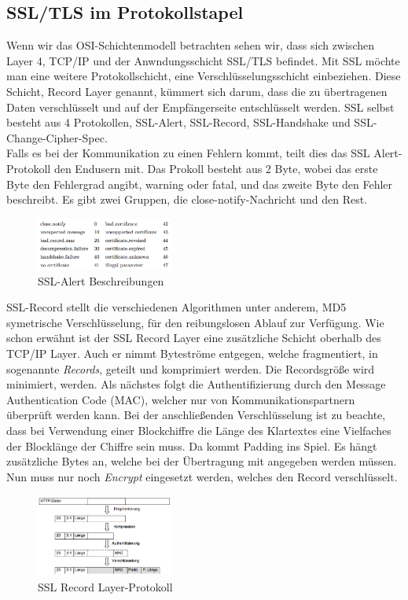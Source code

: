 \documentclass[11pt]{scrartcl}
\begin{document}
\subsection{SSL/TLS im Protokollstapel}
\label{sec:ssl-tls-protocolstack}
Wenn wir das OSI-Schichtenmodell betrachten sehen wir, dass sich zwischen Layer 4, TCP/IP und der Anwndungsschicht SSL/TLS befindet. Mit SSL möchte man eine weitere Protokollschicht, eine Verschlüsselungsschicht einbeziehen. Diese Schicht, Record Layer genannt, kümmert sich darum, dass die zu übertragenen Daten verschlüsselt und auf der Empfängerseite entschlüsselt werden. SSL selbst besteht aus 4 Protokollen, SSL-Alert, SSL-Record, SSL-Handshake und SSL-Change-Cipher-Spec.\\
Falls es bei der Kommunikation zu einen Fehlern kommt, teilt dies das SSL Alert-Protokoll den Endusern mit. Das Prokoll besteht aus 2 Byte, wobei das erste Byte den Fehlergrad angibt, warning oder fatal, und das zweite Byte den Fehler beschreibt. Es gibt zwei Gruppen, die close-notify-Nachricht und den Rest. \cite{1}\cite{6}
\begin{figure}[H]
\includegraphics[width=0.40\textwidth]{Bilder/TLS/SSL-Alert}
	\caption{SSL-Alert Beschreibungen \cite{1}}
	\label{fig12}
\end{figure}
\noindent
SSL-Record stellt die verschiedenen Algorithmen unter anderem, MD5 symetrische Verschlüsselung, für den reibungslosen Ablauf zur Verfügung. Wie schon erwähnt ist der SSL Record Layer eine zusätzliche Schicht oberhalb des TCP/IP Layer. Auch er nimmt Byteströme entgegen, welche fragmentiert, in sogenannte \textit{Records}, geteilt und komprimiert werden. Die Recordsgröße wird minimiert, werden. Als nächstes folgt die Authentifizierung durch den Message Authentication Code (MAC), welcher nur von Kommunikationspartnern überprüft werden kann. \grqq{}Bei der anschließenden Verschlüsselung ist zu beachte, dass bei Verwendung einer Blockchiffre die Länge des Klartextes eine Vielfaches der Blocklänge der Chiffre sein muss.\grqq{}\cite{1} Da kommt Padding ins Spiel. Es hängt zusätzliche Bytes an, welche bei der Übertragung mit angegeben werden müssen. Nun muss nur noch \textit{Encrypt} eingesetzt werden, welches den Record verschlüsselt. \cite{1}
\begin{figure}[H]
\includegraphics[width=0.40\textwidth]{Bilder/TLS/SSL-Record}
	\caption{SSL Record Layer-Protokoll \cite{1}}
	\label{fig13}
\end{figure}
\end{document}
